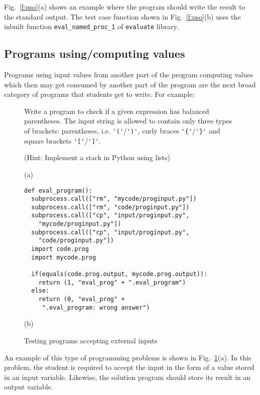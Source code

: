 \documentclass[sigconf]{acmart}
\begin{document}
Fig.~\ref{f:pso}(a) shows an example where the program should write the result to the standard output. The test case function shown in Fig.~\ref{f:pso}(b) uses the inbuilt function \lstinline[style=pc]|eval_named_proc_1| of \lstinline[style=pc]|evaluate| library.

\subsection{Programs using/computing values}
Programs using input values from another part of the program computing values which then may get consumed by another part of the program are the next broad category of programs that students get to write. For example:

\begin{figure}
\begin{mdframed}[frametitle=Example]
Write a program to check if a given expression has balanced parentheses. The input string is allowed to contain only three types of brackets: parentheses, i.e. \lstinline[style=pc]@'('@/\lstinline[style=pc]@')'@, curly braces \lstinline[style=pc]@'{'@/\lstinline[style=pc]@'}'@ and square brackets \lstinline[style=pc]@'['@/\lstinline[style=pc]@']'@.

(Hint: Implement a stack in Python using lists)

\end{mdframed}

(a)

\begin{lstlisting}[style=pc]
def eval_program():
  subprocess.call(["rm", "mycode/proginput.py"])
  subprocess.call(["rm", "code/proginput.py"])
  subprocess.call(["cp", "input/proginput.py",
    "mycode/proginput.py"])
  subprocess.call(["cp", "input/proginput.py",
    "code/proginput.py"])
  import code.prog
  import mycode.prog

  if(equals(code.prog.output, mycode.prog.output)):
    return (1, "eval_prog" + ".eval_program")
  else:
    return (0, "eval_prog" +
     ".eval_program: wrong answer")
\end{lstlisting}

(b)
\caption{Testing programs accepting external inputs}
\label{f:pio}
\end{figure}

An example of this type of programming problems is shown in Fig.~\ref{f:pio}(a). In this problem, the student is required to accept the input in the form of a value stored in an input variable. Likewise, the solution program should store its result in an output variable.
\end{document}
